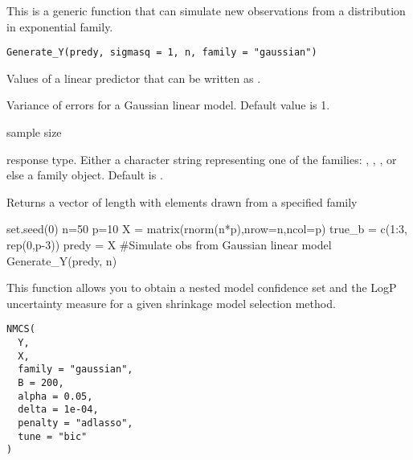 \documentclass[a4paper]{book}
\begin{document}
%
\begin{Description}\relax
This is a generic function that can simulate new observations from a
distribution in exponential family.
\end{Description}
%
\begin{Usage}
\begin{verbatim}
Generate_Y(predy, sigmasq = 1, n, family = "gaussian")
\end{verbatim}
\end{Usage}
%
\begin{Arguments}
\begin{ldescription}
\item[\code{predy}] Values of a linear predictor that can be written as .

\item[\code{sigmasq}] Variance of errors for a Gaussian linear model. Default value is 1.

\item[\code{n}] sample size

\item[\code{family}] response type. Either a character string representing one of
the families: , , ,
or else a  family object. Default is .
\end{ldescription}
\end{Arguments}
%
\begin{Value}
Returns a vector of length  with elements drawn from
a specified family
\end{Value}
%
\begin{Examples}
\begin{ExampleCode}
set.seed(0)
n=50
p=10
X = matrix(rnorm(n*p),nrow=n,ncol=p)
true_b = c(1:3, rep(0,p-3))
predy = X %
#Simulate obs from Gaussian linear model
Generate_Y(predy, n)
\end{ExampleCode}
\end{Examples}
%
\begin{Description}\relax
This function allows you to obtain a nested model confidence set and the LogP uncertainty measure
for a given shrinkage model selection method.
\end{Description}
%
\begin{Usage}
\begin{verbatim}
NMCS(
  Y,
  X,
  family = "gaussian",
  B = 200,
  alpha = 0.05,
  delta = 1e-04,
  penalty = "adlasso",
  tune = "bic"
)
\end{verbatim}
\end{Usage}
\end{document}
